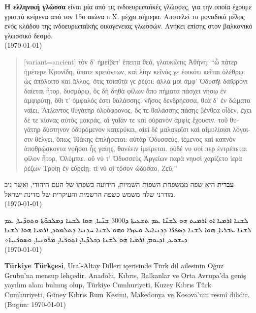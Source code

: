 \documentclass[a4paper]{article}
\begin{document}
\begin{greek}
\textbf{Η ελληνική γλώσσα} είναι μία από τις ινδοευρωπαϊκές γλώσσες, για την
οποία έχουμε γραπτά κείμενα από τον 15ο αιώνα π.Χ. μέχρι σήμερα. Αποτελεί το
μοναδικό μέλος ενός κλάδου της ινδοευρωπαϊκής οικογένειας γλωσσών. Ανήκει
επίσης στον βαλκανικό γλωσσικό δεσμό.\\	
(\today) 
\end{greek}

\begin{quote}
\begin{greek}[variant=ancient]
τὸν δ' ἠμείβετ' ἔπειτα θεά, γλαυκῶπις Ἀθήνη:
“ὦ πάτερ ἡμέτερε Κρονίδη, ὕπατε κρειόντων,
καὶ λίην κεῖνός γε ἐοικότι κεῖται ὀλέθρῳ:
ὡς ἀπόλοιτο καὶ ἄλλος, ὅτις τοιαῦτά γε ῥέζοι:
ἀλλά μοι ἀμφ' Ὀδυσῆι δαί̈φρονι δαίεται ἦτορ,
δυσμόρῳ, ὃς δὴ δηθὰ φίλων ἄπο πήματα πάσχει
νήσῳ ἐν ἀμφιρύτῃ, ὅθι τ' ὀμφαλός ἐστι θαλάσσης.
νῆσος δενδρήεσσα, θεὰ δ' ἐν δώματα ναίει,
Ἄτλαντος θυγάτηρ ὀλοόφρονος, ὅς τε θαλάσσης
πάσης βένθεα οἶδεν, ἔχει δέ τε κίονας αὐτὸς
μακράς, αἳ γαῖάν τε καὶ οὐρανὸν ἀμφὶς ἔχουσιν.
τοῦ θυγάτηρ δύστηνον ὀδυρόμενον κατερύκει,
αἰεὶ δὲ μαλακοῖσι καὶ αἱμυλίοισι λόγοισιν
θέλγει, ὅπως Ἰθάκης ἐπιλήσεται: αὐτὰρ Ὀδυσσεύς,
ἱέμενος καὶ καπνὸν ἀποθρῴσκοντα νοῆσαι
ἧς γαίης, θανέειν ἱμείρεται. οὐδέ νυ σοί περ
ἐντρέπεται φίλον ἦτορ, Ὀλύμπιε. οὔ νύ τ' Ὀδυσσεὺς
Ἀργείων παρὰ νηυσὶ χαρίζετο ἱερὰ ῥέζων
Τροίῃ ἐν εὐρείῃ; τί νύ οἱ τόσον ὠδύσαο, Ζεῦ;”
\end{greek}
\end{quote}

\begin{hebrew}
\textbf{עברית} היא שפה ממשפחת השפות השמיות, הידועה כשפתו של העם היהודי, ואשר ניב מודרני שלה משמש כשפה הרשמית והעיקרית של מדינת ישראל. \\
(\today)
\end{hebrew}

\begin{syriac}%
	ܠܫܢܐ ܐܪܡܝܐ ܐܘ ܐܪܡܝܬ ܗܘ ܠܫܢ̈ܐ ܥܡ ܬܫܥܝܬܐ ܕ\textrm{3000} ܫܢ̈ܝܐ܂ ܗܘܐ ܠܫܢܐ ܕܡܠܟܘ̈ܬܐ ܘܬܘܕ̈ܝܬܐ܂ ܥܡ ܠܫܢܐ ܥܒܪܝܐ܄ ܗܘܐ ܠܫܢܐ ܕܣܦܪ̈ܐ ܕܕܢܝܐܝܠ ܘܥܙܪܐ ܘܗܘ ܠܫܢܐ ܚܕܢܝܐ ܕܬܠܡܘܕ܂ ܐܪܡܝܐ ܗܘܐ ܠܫܢܐ ܕܝܫܘܥ܂ ܐܕܝܘܡ܄ ܐܪܡܝܐ ܗܘ ܠܫܢܐ ܕܟܠܕ̈ܝܐ܄ ܐܬܘܪ̈ܝܐ܄ ܡܪ̈ܘܢܝܐ܄ ܘܣܘܪ̈ܝܝܐ܀ \\
(\today)
\end{syriac}

\begin{turkish}
\textbf{Türkiye Türkçesi}, Ural-Altay Dilleri içerisinde Türk dil ailesinin Oğuz Grubu'na mensup lehçedir. Anadolu, Kıbrıs, Balkanlar ve Orta Avrupa'da geniş yayılım alanı bulmuş olup, Türkiye Cumhuriyeti, Kuzey Kıbrıs Türk Cumhuriyeti, Güney Kıbrıs Rum Kesimi, Makedonya ve Kosova'nın resmî dilidir. \\
(Bugün: \today)
\end{turkish}
\end{document}
